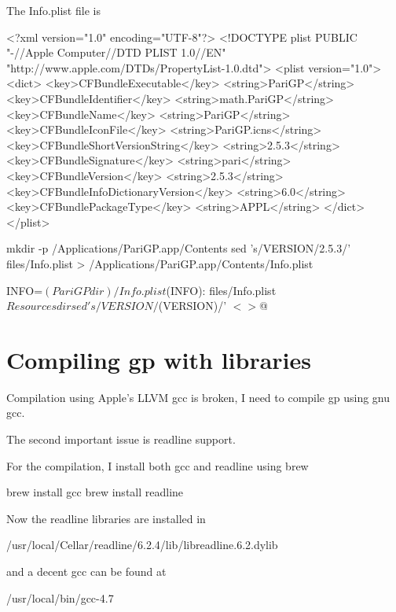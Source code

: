 \documentclass[article]{pastex}
\begin{document}
The Info.plist file is
\begin{code}[xml]
<?xml version="1.0" encoding="UTF-8"?>
<!DOCTYPE plist PUBLIC "-//Apple Computer//DTD PLIST 1.0//EN" 
                       "http://www.apple.com/DTDs/PropertyList-1.0.dtd">
<plist version="1.0">
<dict>
    <key>CFBundleExecutable</key>
    <string>PariGP</string>
    <key>CFBundleIdentifier</key>
    <string>math.PariGP</string>
    <key>CFBundleName</key>
    <string>PariGP</string>
    <key>CFBundleIconFile</key>
    <string>PariGP.icns</string>
    <key>CFBundleShortVersionString</key>
    <string>2.5.3</string>
    <key>CFBundleSignature</key>
    <string>pari</string>
    <key>CFBundleVersion</key>
    <string>2.5.3</string>
    <key>CFBundleInfoDictionaryVersion</key>
    <string>6.0</string>
    <key>CFBundlePackageType</key>
    <string>APPL</string>
  </dict>
</plist>
\end{code}

\begin{code}[sh]
mkdir -p /Applications/PariGP.app/Contents
sed 's/VERSION/2.5.3/' files/Info.plist > /Applications/PariGP.app/Contents/Info.plist
\end{code}

\begin{code}[make]
INFO=$(PariGPdir)/Info.plist

$(INFO): files/Info.plist ${Resourcesdir}
	sed 's/VERSION/$(VERSION)/' $< > $@

\end{code}


\section{Compiling gp with libraries}

Compilation using Apple's LLVM gcc is broken, I need
to compile gp using gnu gcc.

The second important issue is readline support.

For the compilation, I install both gcc and readline
using brew
\begin{code}[sh]
brew install gcc
brew install readline
\end{code}

Now the readline libraries are installed in
\begin{code}[sh]
/usr/local/Cellar/readline/6.2.4/lib/libreadline.6.2.dylib
\end{code}
and a decent gcc can be found at
\begin{code}[sh]
/usr/local/bin/gcc-4.7
\end{code}
\end{document}
